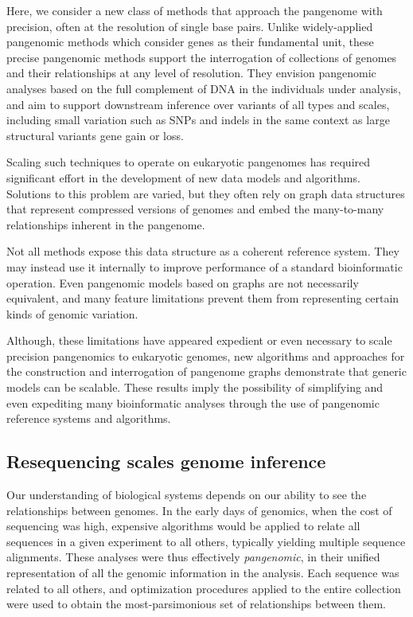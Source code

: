 Here, we consider a new class of methods that approach the pangenome with precision, often at the resolution of single base pairs.
Unlike widely-applied pangenomic methods which consider genes as their fundamental unit, these precise pangenomic methods support the interrogation of collections of genomes and their relationships at any level of resolution.
They envision pangenomic analyses based on the full complement of DNA in the individuals under analysis, and aim to support downstream inference over variants of all types and scales, including small variation such as SNPs and indels in the same context as large structural variants gene gain or loss.

Scaling such techniques to operate on eukaryotic pangenomes has required significant effort in the development of new data models and algorithms.
Solutions to this problem are varied, but they often rely on graph data structures that represent compressed versions of genomes and embed the many-to-many relationships inherent in the pangenome.

Not all methods expose this data structure as a coherent reference system.
They may instead use it internally to improve performance of a standard bioinformatic operation.
Even pangenomic models based on graphs are not necessarily equivalent, and many feature limitations prevent them from representing certain kinds of genomic variation.

Although, these limitations have appeared expedient or even necessary to scale precision pangenomics to eukaryotic genomes, new algorithms and approaches for the construction and interrogation of pangenome graphs demonstrate that generic models can be scalable.
These results imply the possibility of simplifying and even expediting many bioinformatic analyses through the use of pangenomic reference systems and algorithms.

\subsection{Resequencing scales genome inference}

Our understanding of biological systems depends on our ability to see the relationships between genomes.
In the early days of genomics, when the cost of sequencing was high, expensive algorithms would be applied to relate all sequences in a given experiment to all others, typically yielding multiple sequence alignments.
These analyses were thus effectively \emph{pangenomic}, in their unified representation of all the genomic information in the analysis.
Each sequence was related to all others, and optimization procedures applied to the entire collection were used to obtain the most-parsimonious set of relationships between them.

